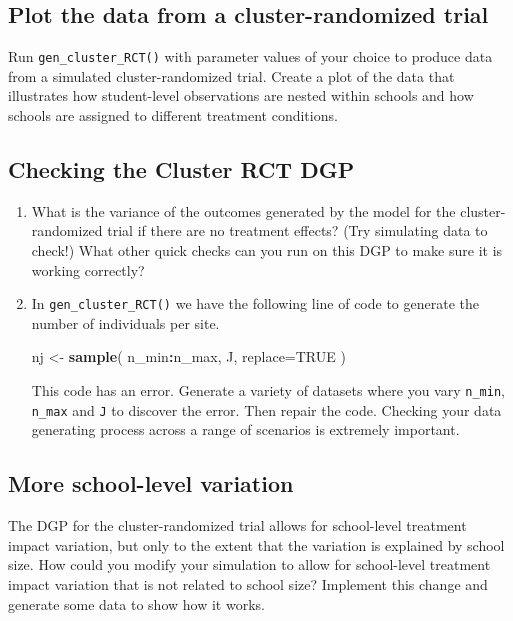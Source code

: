 \documentclass[
]{book}
\newenvironment{Shaded}{\begin{snugshade}}{\end{snugshade}}
\newcommand{\AttributeTok}[1]{\textcolor[rgb]{0.13,0.29,0.53}{#1}}
\newcommand{\ConstantTok}[1]{\textcolor[rgb]{0.56,0.35,0.01}{#1}}
\newcommand{\FunctionTok}[1]{\textcolor[rgb]{0.13,0.29,0.53}{\textbf{#1}}}
\newcommand{\NormalTok}[1]{#1}
\newcommand{\OtherTok}[1]{\textcolor[rgb]{0.56,0.35,0.01}{#1}}
\newcommand{\SpecialCharTok}[1]{\textcolor[rgb]{0.81,0.36,0.00}{\textbf{#1}}}
\begin{document}
\subsection{Plot the data from a cluster-randomized trial}\label{cluster-RCT-plot}

Run \texttt{gen\_cluster\_RCT()} with parameter values of your choice to produce data from a simulated cluster-randomized trial. Create a plot of the data that illustrates how student-level observations are nested within schools and how schools are assigned to different treatment conditions.

\subsection{Checking the Cluster RCT DGP}\label{cluster-RCT-checks}

\begin{enumerate}
\def\labelenumi{\arabic{enumi}.}
\item
  What is the variance of the outcomes generated by the model for the cluster-randomized trial if there are no treatment effects? (Try simulating data to check!) What other quick checks can you run on this DGP to make sure it is working correctly?
\item
  In \texttt{gen\_cluster\_RCT()} we have the following line of code to generate the number of individuals per site.

\begin{Shaded}
\begin{Highlighting}[]
\NormalTok{nj }\OtherTok{\textless{}{-}} \FunctionTok{sample}\NormalTok{( n\_min}\SpecialCharTok{:}\NormalTok{n\_max, J, }\AttributeTok{replace=}\ConstantTok{TRUE}\NormalTok{ )}
\end{Highlighting}
\end{Shaded}

  This code has an error. Generate a variety of datasets where you vary \texttt{n\_min}, \texttt{n\_max} and \texttt{J} to discover the error. Then repair the code.
  Checking your data generating process across a range of scenarios is extremely important.
\end{enumerate}

\subsection{More school-level variation}\label{cluster-RCT-heterogeneity}

The DGP for the cluster-randomized trial allows for school-level treatment impact variation, but only to the extent that the variation is explained by school size. How could you modify your simulation to allow for school-level treatment impact variation that is not related to school size? Implement this change and generate some data to show how it works.
\end{document}
